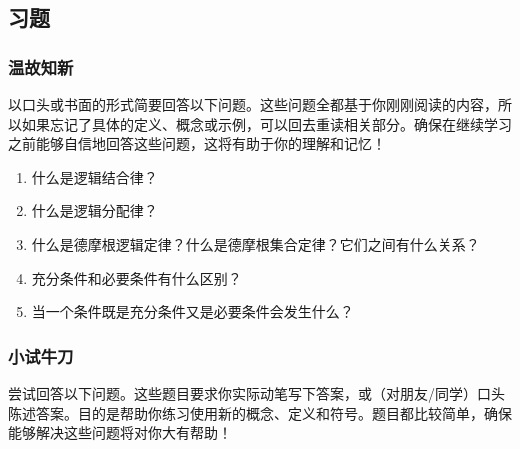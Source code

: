 

\subsection{习题}

\subsubsection*{温故知新}

以口头或书面的形式简要回答以下问题。这些问题全都基于你刚刚阅读的内容，所以如果忘记了具体的定义、概念或示例，可以回去重读相关部分。确保在继续学习之前能够自信地回答这些问题，这将有助于你的理解和记忆！

\begin{enumerate}[label=(\arabic*)]
    \item 什么是逻辑结合律？
    \item 什么是逻辑分配律？
    \item 什么是德摩根逻辑定律？什么是德摩根集合定律？它们之间有什么关系？
    \item 充分条件和必要条件有什么区别？
    \item 当一个条件既是充分条件又是必要条件会发生什么？
\end{enumerate}

\subsubsection*{小试牛刀}

尝试回答以下问题。这些题目要求你实际动笔写下答案，或（对朋友/同学）口头陈述答案。目的是帮助你练习使用新的概念、定义和符号。题目都比较简单，确保能够解决这些问题将对你大有帮助！

